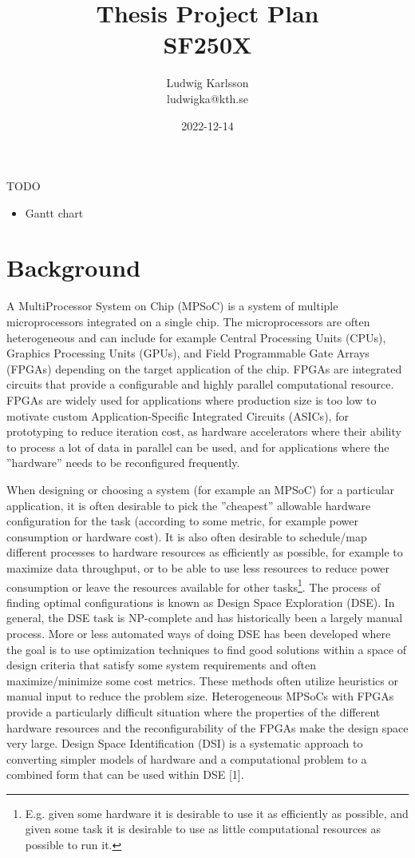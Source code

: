 \documentclass[12pt,notitlepage]{article}
\title{Thesis Project Plan\\SF250X}
\author{Ludwig Karlsson\\ludwigka@kth.se}
\date{2022-12-14}
\begin{document}
\maketitle

TODO
\begin{itemize}
\item Gantt chart
\end{itemize}

\section{Background}
A MultiProcessor System on Chip (MPSoC) is a system of multiple microprocessors integrated on a single chip. The microprocessors are often heterogeneous and can include for example Central Processing Units (CPUs), Graphics Processing Units (GPUs), and Field Programmable Gate Arrays (FPGAs) depending on the target application of the chip. FPGAs are integrated circuits that provide a configurable and highly parallel computational resource. FPGAs are widely used for applications where production size is too low to motivate custom Application-Specific Integrated Circuits (ASICs), for prototyping to reduce iteration cost, as hardware accelerators where their ability to process a lot of data in parallel can be used, and for applications where the ''hardware'' needs to be reconfigured frequently.

When designing or choosing a system (for example an MPSoC) for a particular application, it is often desirable to pick the ''cheapest'' allowable hardware configuration for the task (according to some metric, for example power consumption or hardware cost). It is also often desirable to schedule/map different processes to hardware resources as efficiently as possible, for example to maximize data throughput, or to be able to use less resources to reduce power consumption or leave the resources available for other tasks\footnote{E.g. given some hardware it is desirable to use it as efficiently as possible, and given some task it is desirable to use as little computational resources as possible to run it.}. The process of finding optimal configurations is known as Design Space Exploration (DSE). In general, the DSE task is NP-complete and has historically been a largely manual process. More or less automated ways of doing DSE has been developed where the goal is to use optimization techniques to find good solutions within a space of design criteria that satisfy some system requirements and often maximize/minimize some cost metrics. These methods often utilize heuristics or manual input to reduce the problem size. Heterogeneous MPSoCs with FPGAs provide a particularly difficult situation where the properties of the different hardware resources and the reconfigurability of the FPGAs make the design space very large. Design Space Identification (DSI) is a systematic approach to converting simpler models of hardware and a computational problem to a combined form that can be used within DSE [1].
\end{document}
